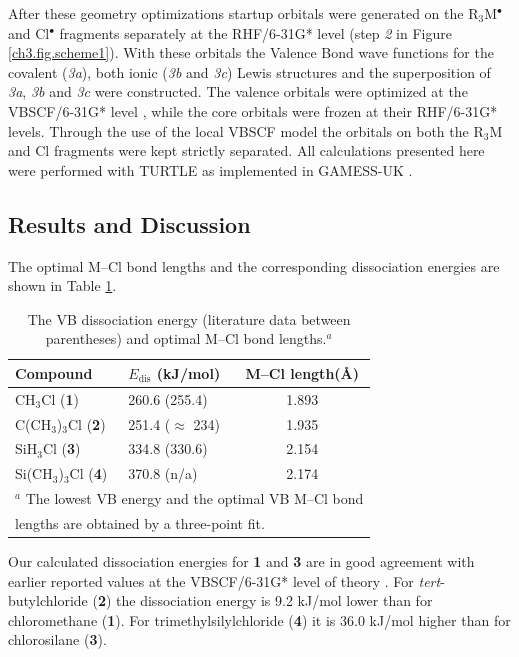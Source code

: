 After these geometry optimizations startup orbitals were generated on the R$_3$M$^{\bullet}$ and Cl$^{\bullet}$ fragments separately at the \mbox{RHF/6-31G*} level (step \textit{2} in Figure \ref{ch3.fig.scheme1}).  With these orbitals the Valence Bond wave functions for the covalent (\textit{3a}), both ionic (\textit{3b} and \textit{3c}) Lewis structures and the superposition of \textit{3a}, \textit{3b} and \textit{3c} were constructed. The valence orbitals were optimized at the \mbox{VBSCF/6-31G*} level \cite{vbscf1,vbscf2}, while the core orbitals were frozen at their \mbox{RHF/6-31G*} levels.
Through the use of the local VBSCF model the orbitals on both the R$_3$M and Cl fragments were kept strictly separated. All calculations presented here were performed with TURTLE \cite{turtle} as implemented in GAMESS-UK \cite{gamess}.

\subsection{Results and Discussion}

The optimal M--Cl bond lengths and the corresponding dissociation energies are shown in Table \ref{ch3.tab.optimal}.  
\begin{table}[htp]
\center
\caption{The VB dissociation energy (literature data \cite{lauvergnat,song} between parentheses) and optimal M--Cl bond lengths.$^a$}
\begin{tabular}{ l l c} 
\hline
Compound &$E_\mathrm{dis}$ (kJ/mol)& M--Cl length(\AA)\\
\hline
CH$_3$Cl (\textbf{1})& 260.6 (255.4) & 1.893 \\
C(CH$_3$)$_3$Cl (\textbf{2}) & 251.4 ($\approx$ 234) & 1.935 \\
SiH$_3$Cl (\textbf{3})& 334.8 (330.6)& 2.154 \\
Si(CH$_3$)$_3$Cl (\textbf{4}) & 370.8 (n/a) & 2.174 \\
\multicolumn{3}{l}{\small{$^a$ The lowest VB energy and the optimal VB M--Cl bond}}\\
\multicolumn{3}{l}{\small{lengths are obtained by a three-point fit.}}\\
\end{tabular}
\label{ch3.tab.optimal}
\end{table}
Our calculated dissociation energies for \textbf{1} and \textbf{3} are in good agreement with earlier reported values at the VBSCF/6-31G* level of theory \cite{lauvergnat}.  For \textit{tert}-butylchloride (\textbf{2}) the dissociation energy is 9.2 kJ/mol lower than for chloromethane (\textbf{1}). For trimethylsilylchloride (\textbf{4}) it is 36.0 kJ/mol higher than for chlorosilane (\textbf{3}). 
 
